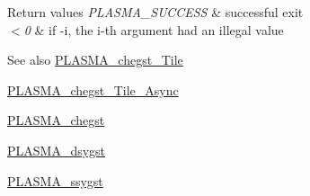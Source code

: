 \begin{DoxyRetVals}{Return values}
{\em P\+L\+A\+S\+M\+A\+\_\+\+S\+U\+C\+C\+E\+S\+S} & successful exit \\
\hline
{\em $<$0} & if -\/i, the i-\/th argument had an illegal value\\
\hline
\end{DoxyRetVals}
\begin{DoxySeeAlso}{See also}
\hyperlink{group__PLASMA__Complex32__t__Tile_ga4315d3e8b6248219e35e1d181dd13b68_ga4315d3e8b6248219e35e1d181dd13b68}{P\+L\+A\+S\+M\+A\+\_\+chegst\+\_\+\+Tile} 

\hyperlink{group__PLASMA__Complex32__t__Tile__Async_ga10f32270e2c1574a884ad5f10084f753_ga10f32270e2c1574a884ad5f10084f753}{P\+L\+A\+S\+M\+A\+\_\+chegst\+\_\+\+Tile\+\_\+\+Async} 

\hyperlink{group__PLASMA__Complex32__t_gac4b81a8ac8396c84a27d8a0b719bc379_gac4b81a8ac8396c84a27d8a0b719bc379}{P\+L\+A\+S\+M\+A\+\_\+chegst} 

\hyperlink{group__double_ga7ab44c615960d36295086012efc45a7d_ga7ab44c615960d36295086012efc45a7d}{P\+L\+A\+S\+M\+A\+\_\+dsygst} 

\hyperlink{group__float_ga66b77c0de44f80760c4184756250e75e_ga66b77c0de44f80760c4184756250e75e}{P\+L\+A\+S\+M\+A\+\_\+ssygst} 
\end{DoxySeeAlso}
\hypertarget{group__PLASMA__Complex32__t_ga7d0aad7dba26173b3cc6f35a74f6eaf0_ga7d0aad7dba26173b3cc6f35a74f6eaf0}{}
